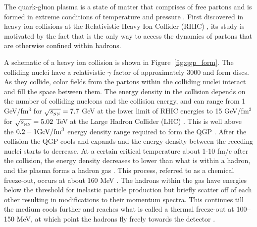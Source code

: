 
The quark-gluon plasma is a state of matter that comprises of free partons and is formed in extreme conditions of temperature and pressure \cite{SHURYAK198071}.
First discovered in heavy ion collisions at the Relativistic Heavy Ion Collider (RHIC) \cite{ARSENE20051, Adcox:2004mh, ADAMS2005102, Back:2004je}, its study is motivated by the fact that is the only way to access the dynamics of partons that are otherwise confined within hadrons.


A schematic of a heavy ion collision is shown in Figure~\ref{fig:qgp_form}.
The colliding nuclei have a relativistic $\gamma$ factor of approximately 3000 and form discs.
As they collide, color fields from the partons within the colliding nuclei interact and fill the space between them.
The energy density in the collision depends on the number of colliding nucleons and the collision energy, and can range from 1 GeV/fm$^3$ for $\mbox{$\sqrt{s_{_\text{NN}}}$} = 7.7$ GeV at the lower limit of RHIC energies \cite{PhysRevC.93.024901} to 15 GeV/fm$^3$ for $\mbox{$\sqrt{s_{_\text{NN}}}$} = 5.02$ TeV at the Large Hadron Collider (LHC) \cite{PhysRevC.94.034903, PhysRevLett.109.152303, Jiang:2018wzu}.
This is well above the $0.2 - 1 \rm{GeV}/\rm{fm}^3$ energy density range required to form the QGP \cite{Karsch2002, PhysRevD.90.094503}.
After the collision the QGP cools and expands and the energy density between the receding nuclei starts to decrease.
At a certain critical temperature about 1-10 fm/c after the collision, the energy density decreases to lower than what is within a hadron, and the plasma forms a hadron gas \cite{doi:10.1146/annurev.nucl.46.1.71}.
This process, referred to as a chemical freeze-out, occurs at about 160 MeV \cite{Fodor_2004, ADAMS2005102, PhysRevC.93.024917, Borsanyi:2010bp}.
The hadrons within the gas have energies below the threshold for inelastic particle production but briefly scatter off of each other resulting in modifications to their momentum spectra.
This continues till the medium cools further and reaches what is called a thermal freeze-out at 100--150 MeV, at which point the hadrons fly freely towards the detector \cite{PhysRevC.69.024904, PhysRevC.72.014908, PhysRevC.75.024910, PhysRevC.88.044910}.

